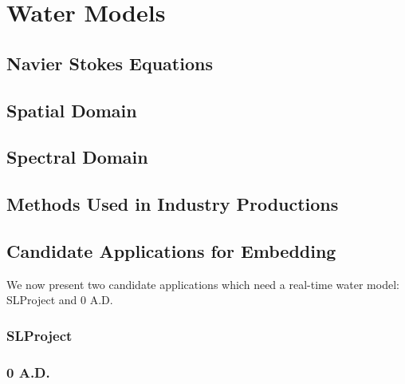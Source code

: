 \section{Water Models}\label{sec:water_models}



\subsection{Navier Stokes Equations}\label{subsec:navier_stokes}
\subsection{Spatial Domain}\label{subsec:spatial_domain}
\subsection{Spectral Domain}\label{subsec:spectral_domain}
\subsection{Methods Used in Industry Productions}\label{subsec:methods_industry}


\subsection{Candidate Applications for Embedding}\label{subsec:candidate_apps}


We now present two candidate applications which need a real-time water model:
SLProject and 0 A.D.

\subsubsection{SLProject}



\subsubsection{0 A.D.}


